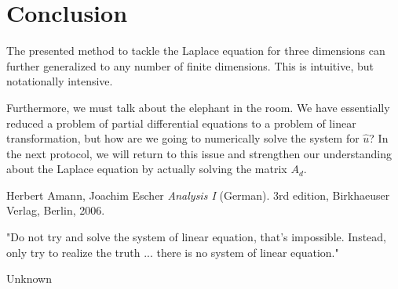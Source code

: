 \documentclass[refman]{article}
\theoremstyle{definition}
\begin{document}
	
	\newpage
    \justify
    
    
    
    
    
    
\section{Conclusion}
The presented method to tackle the Laplace equation for three dimensions can further generalized to any number of finite dimensions. This is intuitive, but notationally intensive.

Furthermore, we must talk about the elephant in the room. We have essentially reduced a problem of partial differential equations to a problem of linear transformation, but how are we going to numerically solve the system for \(\hat{u}\)? In the next protocol, we will return to this issue and strengthen our understanding about the Laplace equation by actually solving the matrix \(A_d\).
\medskip
\begin{thebibliography}{9}
    Herbert Amann, Joachim Escher
    \textit{Analysis I} (German). 
    3rd edition, Birkhaeuser Verlag, Berlin, 2006.
\end{thebibliography}

    \newpage
    \epigraph{"Do not try and solve the system of linear equation, that's impossible. Instead, only try to realize the truth ... there is no system of linear equation."}{Unknown}
\end{document}
